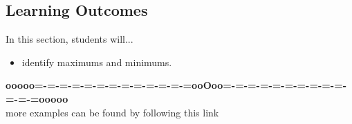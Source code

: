 \documentclass{ximera}
\begin{document}
\subsection{Learning Outcomes}

\begin{sectionOutcomes}
In this section, students will...

\begin{itemize}
\item identify maximums and minimums.
\end{itemize}
\end{sectionOutcomes}



















\begin{center}
\textbf{\textcolor{green!50!black}{ooooo=-=-=-=-=-=-=-=-=-=-=-=-=ooOoo=-=-=-=-=-=-=-=-=-=-=-=-=ooooo}} \\

more examples can be found by following this link\\ 

\end{center}
\end{document}
